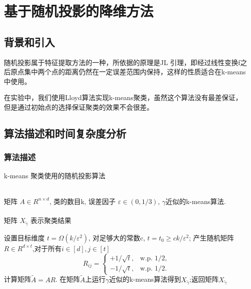 \documentclass{ctexart}
\begin{document}
    \section{基于随机投影的降维方法}
    \label{sec:rpsec}

    \subsection{背景和引入}
        随机投影属于特征提取方法的一种，所依据的原理是JL 引理\cite{johnson1984extensions}，即经过线性变换f之后原点集中两个点的距离仍然在一定误差范围内保持，这样的性质适合在k-means中使用。

        在实验中，我们使用Lloyd算法实现k-means聚类，虽然这个算法没有最差保证，但是通过初始点的选择保证聚类的效果不会很差。

    \subsection{算法描述和时间复杂度分析}
    \subsubsection{算法描述}
    \renewcommand{\algorithmicrequire}{ \textbf{Input:}} %
    \renewcommand{\algorithmicensure}{ \textbf{Output:}} %
    \begin{algorithm}[htb]
    \caption{k-means 聚类使用的随机投影算法}
    \label{RP}
        \begin{algorithmic}[1] %
        \REQUIRE ~~\\ %
            矩阵 $ A \in R^{n \times d}$, 类的数目k, 误差因子 $\varepsilon \in (0, 1/3)$, $\gamma$近似的k-means算法. \\
        \ENSURE ~~\\ %
            矩阵 $ X_{\tilde{\gamma}} $ 表示聚类结果

        \STATE 设置目标维度 $ t = \Omega(k/\varepsilon^2)$, 对足够大的常数c, $t = t_{0} \ge ck/\varepsilon^2 $;
        \label{ step 1 }%
        \STATE 产生随机矩阵 $ R \in R^{d \times t} $,对于所有$ i \in [d], j \in [t]$
        \begin{equation*}
        R_{ij} = \begin{cases} +1/\sqrt{t},& \mbox{w.p. 1/2,} \\ -1/\sqrt{t}, & \mbox{w.p. 1/2.}\end{cases}
        \end{equation*}
        \label{step 2}
        \STATE 计算矩阵$\tilde{A} = AR$.
        \label{step 3}
        \STATE 在矩阵$ \tilde{A}$上运行$\gamma$近似的k-means算法得到$X_{\tilde{\gamma}}$;返回矩阵$ X_{\tilde{\gamma}}$
        \label{step 4}
        \end{algorithmic}
    \end{algorithm}
\end{document}

